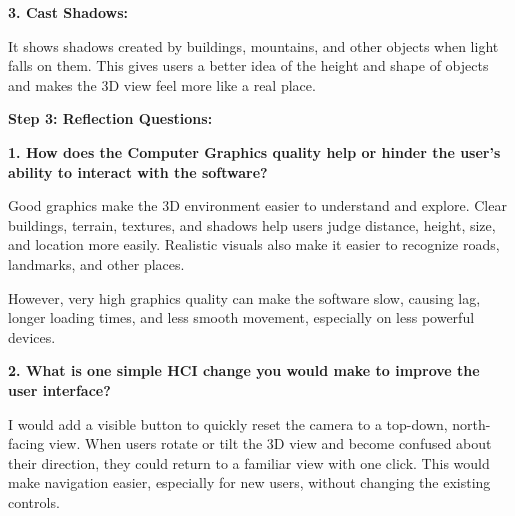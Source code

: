 \documentclass[12pt,a4paper]{article}
\begin{document}
\textbf{3. Cast Shadows:}

It shows shadows created by buildings, mountains, and other objects when light falls on them. This gives users a better idea of the height and shape of objects and makes the 3D view feel more like a real place.


\newpage

\textbf{Step 3: Reflection Questions:}

\vspace{20pt}

\textbf{1. How does the Computer Graphics quality help or hinder the user’s ability to interact with the software?}

Good graphics make the 3D environment easier to understand and explore. Clear buildings, terrain, textures, and shadows help users judge distance, height, size, and location more easily. Realistic visuals also make it easier to recognize roads, landmarks, and other places.

However, very high graphics quality can make the software slow, causing lag, longer loading times, and less smooth movement, especially on less powerful devices.



\vspace{20pt}


\textbf{2. What is one simple HCI change you would make to improve the user interface?}

I would add a visible button to quickly reset the camera to a top-down, north-facing view.
When users rotate or tilt the 3D view and become confused about their direction, they could return to a familiar view with one click. This would make navigation easier, especially for new users, without changing the existing controls.
\end{document}
